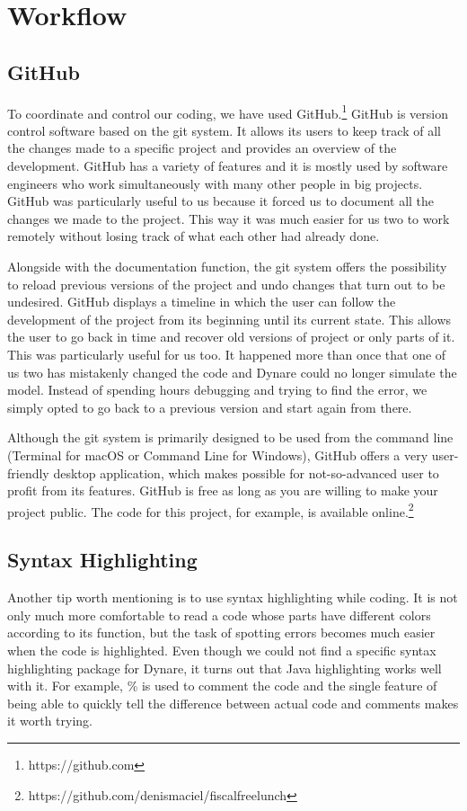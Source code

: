 \section{Workflow}

\subsection*{GitHub}
\label{sub:GitHub}

To coordinate and control our coding, we have used GitHub.\footnote{https://github.com} GitHub is version control software based on the git system. It allows its users to keep track of all the changes made to a specific project and provides an overview of the development. GitHub has a variety of features and it is mostly used by software engineers who work simultaneously with many other people in big projects. GitHub was particularly useful to us because it forced us to document all the changes we made to the project. This way it was much easier for us two to work remotely without losing track of what each other had already done.
\par
\bigskip
Alongside with the documentation function, the git system offers the possibility to reload previous versions of the project and undo changes that turn out to be undesired. GitHub displays a timeline in which the user can follow the development of the project from its beginning until its current state. This allows the user to go back in time and recover old versions of project or only parts of it. This was particularly useful for us too. It happened more than once that one of us two has mistakenly changed the code and Dynare could no longer simulate the model. Instead of spending hours debugging and trying to find the error, we simply opted to go back to a previous version and start again from there.
\par
\bigskip
Although the git system is primarily designed to be used from the command line (Terminal for macOS or Command Line for Windows), GitHub offers a very user-friendly desktop application, which makes possible for not-so-advanced user to profit from its features. GitHub is free as long as you are willing to make your project public. The code for this project, for example, is available online.\footnote{https://github.com/denismaciel/fiscalfreelunch}


\subsection*{Syntax Highlighting}
\label{sub:Syntax Highlighting}

Another tip worth mentioning is to use syntax highlighting while coding. It is not only much more comfortable to read a code whose parts have different colors according to its function, but the task of spotting errors becomes much easier when the code is highlighted. Even though we could not find a specific syntax highlighting package for Dynare, it turns out that Java highlighting works well with it. For example, \% is used to comment the code and the single feature of being able to quickly tell the difference between actual code and comments makes it worth trying.
